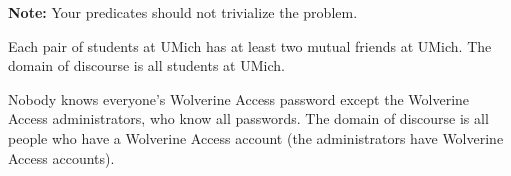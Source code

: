 \documentclass[12pt]{exam}
\begin{document}
\textbf{Note:} Your predicates should not trivialize the problem.

\begin{qparts}
	\item Each pair of students at UMich has at least two mutual friends at UMich. The domain of discourse is all students at UMich.

	\item Nobody knows everyone's Wolverine Access password except the Wolverine Access administrators, who know all passwords. The domain of discourse is all people who have a Wolverine Access account (the administrators have Wolverine Access accounts).
\end{qparts}

\begin{solution}

\end{solution}
\end{document}

